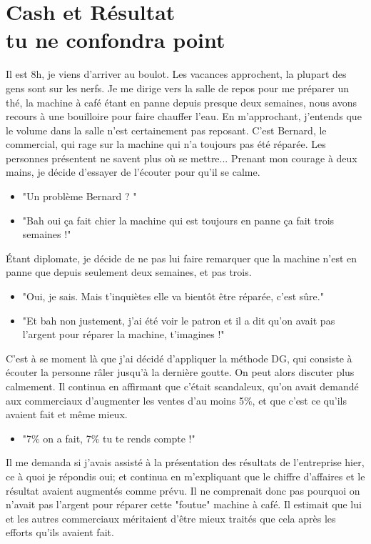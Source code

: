 
\chapter{Cash et Résultat \\ tu ne confondra point}


Il est 8h, je viens d'arriver au boulot.
Les vacances approchent, la plupart des gens sont sur les nerfs. 
Je me dirige vers la salle de repos pour me préparer un thé, 
la machine à café étant en panne depuis presque deux semaines, 
nous avons recours à une bouilloire pour faire chauffer l'eau.
En m'approchant, j'entends que le volume dans la salle n'est 
certainement pas reposant. C'est Bernard, le commercial, 
qui rage sur la machine qui n'a toujours pas été réparée. 
Les personnes présentent ne savent plus où se mettre... 
Prenant mon courage à deux mains, je décide d'essayer de 
l'écouter pour qu'il se calme.
\begin{itemize}
  \item "Un problème Bernard ? "
  \item "Bah oui ça fait chier la machine qui est toujours en 
  panne ça fait trois semaines !"
\end{itemize}
Étant diplomate, je décide de ne pas lui faire remarquer que 
la machine n'est en panne que depuis seulement deux semaines, et pas 
trois.
\begin{itemize}
  \item "Oui, je sais. Mais t'inquiètes elle va bientôt être 
  réparée, c'est sûre."
  \item "Et bah non justement, j'ai été voir le patron et il 
  a dit qu'on avait pas l'argent pour réparer la machine, t'imagines !"
\end{itemize}
C'est à se moment là que j'ai décidé d'appliquer la méthode DG, 
qui consiste à écouter la personne râler jusqu'à la dernière 
goutte. On peut alors discuter plus calmement. 
Il continua en affirmant que c'était scandaleux, qu'on avait 
demandé aux commerciaux d'augmenter les ventes d'au 
moins 5\%, et que c'est ce qu'ils avaient fait et même 
mieux.
\begin{itemize}
  \item "7\% on a fait, 7\% tu te rends compte !"
\end{itemize}
Il me demanda si j'avais assisté à la présentation des 
résultats de l'entreprise hier, ce à quoi je répondis oui; et 
continua en m'expliquant que le chiffre d'affaires et le 
résultat avaient augmentés comme prévu. 
Il ne comprenait donc pas pourquoi on n'avait pas l'argent 
pour réparer cette "foutue" machine à café. 
Il estimait que lui et les autres commerciaux méritaient 
d'être mieux traités que cela après les efforts qu'ils avaient 
fait.

